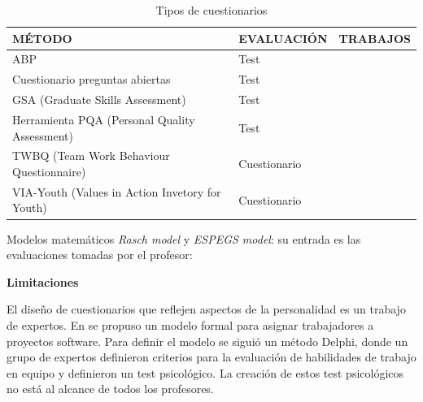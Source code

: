 \begin{table}
  \begin{center}
  \begin{tabular}{| m{3.5cm} | m{3.5cm} | m{5.5cm} |}
    \hline
    MÉTODO & EVALUACIÓN & TRABAJOS\\
    \hline
    \hline
    ABP & Test &  \cite{barbera2011design} \\
    \hline
    Cuestionario preguntas abiertas & Test &  \cite{albergaria2011critical,vizcarro2013assessment} \\
    \hline
    GSA (Graduate Skills Assessment) & Test &  \cite{badcock2010developing} \\
    \hline
    Herramienta PQA (Personal Quality Assessment) & Test &  \cite{lumsden2005assessment} \\
    \hline
    TWBQ (Team Work Behaviour Questionnaire) & Cuestionario &  \cite{park2006moral} \\
    \hline
    VIA-Youth (Values in Action Invetory for Youth) & Cuestionario &  \cite{park2006moral} \\
    \hline
  \end{tabular}
\end{center}
\caption{Tipos de cuestionarios}
\label{tab:MetodosCuestionarios}
\end{table}

Modelos matemáticos \emph{Rasch model} y \emph{ESPEGS model}: su entrada es las evaluaciones tomadas por el profesor: \cite{aziz2007appraisal,rashid2008engineering,a2007outcome}

\bigskip
\textbf{Limitaciones}
\bigskip

El diseño de cuestionarios que reflejen aspectos de la personalidad es un trabajo de expertos. En \cite{andre2011formal} se propuso un modelo formal para asignar trabajadores a proyectos software. Para definir el modelo se siguió un método Delphi, donde un grupo de expertos definieron criterios para la evaluación de habilidades de trabajo en equipo y definieron un test psicológico. La creación de estos test psicológicos no está al alcance de todos los profesores.

